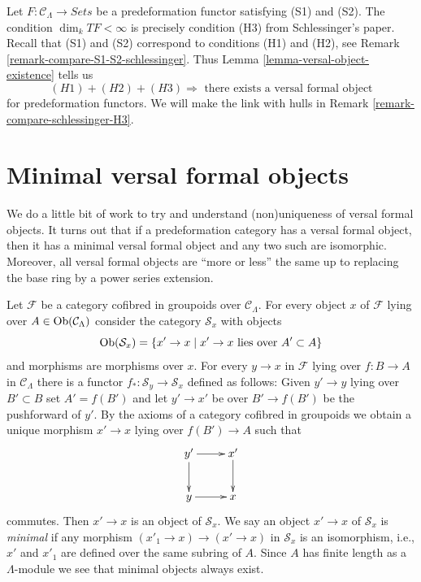 \begin{remark}
\label{remark-compare-schlessinger-H3-pre}
Let $F : \mathcal{C}_\Lambda \to \textit{Sets}$ be a predeformation functor
satisfying (S1) and (S2). The condition $\dim_k TF < \infty$
is precisely condition (H3) from Schlessinger's paper.
Recall that (S1) and (S2) correspond to conditions (H1) and (H2), see
Remark \ref{remark-compare-S1-S2-schlessinger}.
Thus Lemma \ref{lemma-versal-object-existence} tells us
$$
(H1) + (H2) + (H3)
\Rightarrow
\text{ there exists a versal formal object}
$$
for predeformation functors. We will make the link with hulls in
Remark \ref{remark-compare-schlessinger-H3}.
\end{remark}





\section{Minimal versal formal objects}
\label{section-minimal-versal}

\noindent
We do a little bit of work to try and understand (non)uniqueness
of versal formal objects. It turns out that if a predeformation category
has a versal formal object, then it has a minimal versal formal
object and any two such are isomorphic. Moreover, all versal formal
objects are ``more or less'' the same up to replacing the base ring
by a power series extension.

\medskip\noindent
Let $\mathcal{F}$ be a category cofibred in groupoids over
$\mathcal{C}_\Lambda$. For every object $x$ of $\mathcal{F}$
lying over $A \in \mathop{\mathrm{Ob}}\nolimits(\mathcal{C}_\Lambda)$ consider the
category $\mathcal{S}_x$ with objects
$$
\mathop{\mathrm{Ob}}\nolimits(\mathcal{S}_x) =
\{x' \to x \mid x' \to x\text{ lies over }A' \subset A\}
$$
and morphisms are morphisms over $x$. For every $y \to x$ in
$\mathcal{F}$ lying over $f : B \to A$
in $\mathcal{C}_\Lambda$ there is a functor
$f_* : \mathcal{S}_y \to \mathcal{S}_x$ defined as follows:
Given $y' \to y$ lying over $B' \subset B$ set $A' = f(B')$
and let $y' \to x'$ be over $B' \to f(B')$ be the pushforward of $y'$.
By the axioms of a category cofibred in groupoids we obtain a
unique morphism $x' \to x$ lying over $f(B') \to A$ such that
$$
\xymatrix{
y' \ar[d] \ar[r] & x' \ar[d] \\
y \ar[r] & x
}
$$
commutes. Then $x' \to x$ is an object of $\mathcal{S}_x$. We say an
object $x' \to x$ of $\mathcal{S}_x$ is {\it minimal} if any morphism
$(x'_1 \to x) \to (x' \to x)$ in $\mathcal{S}_x$ is an isomorphism, i.e.,
$x'$ and $x'_1$ are defined over the same subring of $A$. Since
$A$ has finite length as a $\Lambda$-module we see that minimal objects
always exist.

